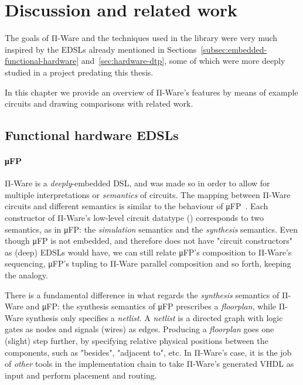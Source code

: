 \chapter{Discussion and related work}
\label{chap:discussion-related-work}

    The goals of Π-Ware and the techniques used in the library were very much inspired by the
    \acp{EDSL} already mentioned in Sections~\ref{subsec:embedded-functional-hardware}
    and~\ref{sec:hardware-dtp}, some of which were more deeply studied in a project
    predating this thesis.

    In this chapter we provide an overview of Π-Ware's features by means of example circuits and
    drawing comparisons with related work.

    \section{Functional hardware \acp{EDSL}}
    \label{sec:discussion-functional}

        \subsubsection{μFP}
        \label{subsubsec:discussion-mufp}
        Π-Ware is a \emph{deeply}-embedded \ac{DSL}, and was made so in order to allow for multiple
        interpretations or \emph{semantics} of circuits.
        The mapping between Π-Ware circuits and different semantics is similar to the behaviour
        of μFP~\cite{mufp-1984}.
        Each constructor of Π-Ware's low-level circuit datatype () corresponds to two
        semantics, as in μFP: the \emph{simulation} semantics and the \emph{synthesis} semantics.
        Even though μFP is not embedded, and therefore does not have "circuit constructors" as
        (deep) \acp{EDSL} would have, we can still relate μFP's composition to Π-Ware's sequencing,
        μFP's tupling to Π-Ware parallel composition and so forth, keeping the analogy.

        There is a fundamental difference in what regards the \emph{synthesis} semantics of Π-Ware
        and μFP: the synthesis semantics of μFP prescribes a \emph{floorplan}, while Π-Ware synthesis
        only specifies a \emph{netlist}.
        A \emph{netlist} is a directed graph with logic gates as nodes and signals (wires) as edges.
        Producing a \emph{floorplan} goes one (slight) step further, by specifying relative
        physical positions between the components, such as "besides", "adjacent to", etc.
        In Π-Ware's case, it is the job of \emph{other} tools in the implementation chain to take
        Π-Ware's generated \ac{VHDL} as input and perform placement and routing.

